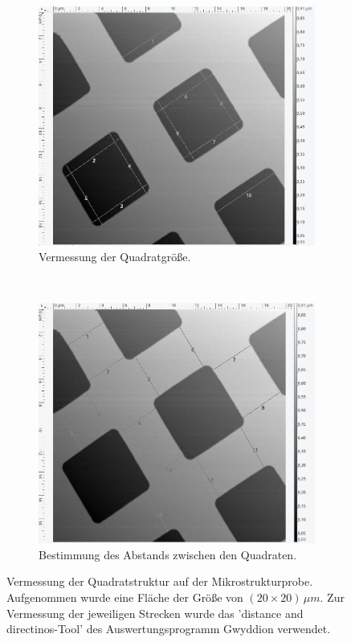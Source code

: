 %
\begin{figure}[H]
\centering
	\begin{subfigure}[t]{0.45\textwidth}
	\includegraphics[width=\textwidth]{AFM_auswertung/quad_durch_vor.png}
	\caption{Vermessung der Quadratgr\"o{\ss}e.}
	\label{abb:quada}
	\end{subfigure}
	~
	\begin{subfigure}[t]{0.45\textwidth}
	\includegraphics[width=\textwidth]{AFM_auswertung/quad_abb_vor.png}
	\caption{Bestimmung des Abstands zwischen den Quadraten.}
	\label{abb:quadb}
	\end{subfigure}
\caption{Vermessung der Quadratstruktur auf der Mikrostrukturprobe. Aufgenommen wurde eine Fl\"ache der Gr\"o{\ss}e von $(20 \times 20) \, \mu m$. Zur Vermessung der jeweiligen Strecken wurde das 'distance and directinos-Tool' des Auswertungsprogramm Gwyddion verwendet.}
\label{abb:quad}
\end{figure}
